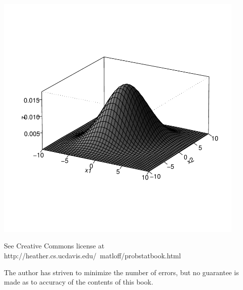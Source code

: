 \vspace{-1.5in}
\begin{center}
\includegraphics[width=4.8in]{Bell.pdf}

{\LARGE See Creative Commons license at \\ 
\vspace{0.2in}
{http://heather.cs.ucdavis.edu/~matloff/probstatbook.html}
}

The author has striven to minimize the number of errors, but no
guarantee is made as to accuracy of the contents of this book.

\end{center}

